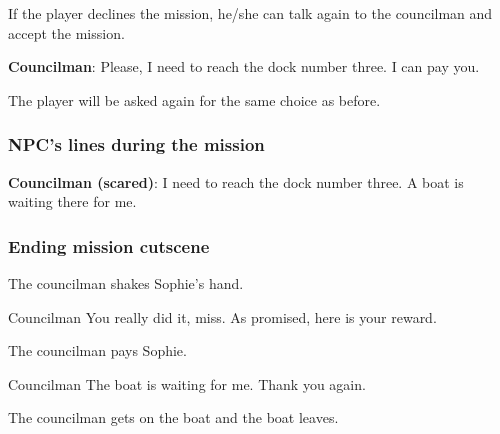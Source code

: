 If the player declines the mission, he/she can talk again to the councilman and accept the mission.

\textbf{Councilman}: Please, I need to reach the dock number three. I can pay you.

The player will be asked again for the same choice as before.

\subsubsection*{NPC's lines during the mission}
\textbf{Councilman (scared)}: I need to reach the dock number three. A boat is waiting there for me.

\subsubsection*{Ending mission cutscene}
\begin{screenplay}

The councilman shakes Sophie's hand.

\begin{dialogue}[grateful]{Councilman}
You really did it, miss. As promised, here is your reward.
\end{dialogue}

The councilman pays Sophie.

\begin{dialogue}[continuing]{Councilman}
The boat is waiting for me. Thank you again.
\end{dialogue}

The councilman gets on the boat and the boat leaves.

\end{screenplay}

